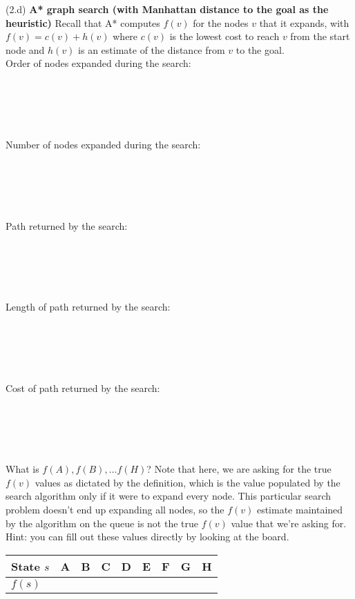 \documentclass{article}
\begin{document}
\newpage
\noindent (2.d) \textbf{A* graph search (with Manhattan distance to the goal as the heuristic)} Recall that A* computes $f(v)$ for the nodes $v$ that it expands, with $f (v) = c(v) + h(v)$ where $c(v)$ is the lowest cost to reach $v$ from the start node and $h(v)$ is an estimate of the distance from $v$ to the goal.
~\\ 
Order of nodes expanded during the search:\\
~\\
~\\
~\\
~\\
~\\
Number of nodes expanded during the search:\\
~\\
~\\
~\\
~\\
~\\
Path returned by the search:\\
~\\
~\\
~\\
~\\
~\\
Length of path returned by the search:\\
~\\
~\\
~\\
~\\
~\\
Cost of path returned by the search:\\
~\\
~\\
~\\
~\\
~\\
What is $f(A), f(B), \ldots f(H)$? Note that here, we are asking for the true $f(v)$ values as dictated by the definition, which is the value populated by the search algorithm only if it were to expand every node. This particular search problem doesn't end up expanding all nodes, so the $f(v)$ estimate maintained by the algorithm on the queue is not the true $f(v)$ value that we’re asking for. Hint: you can fill out these values directly by looking at the board.

\renewcommand\arraystretch{1.5}
\begin{table}[tbh!]
\begin{center}
    \begin{tabular}{|p{2cm}| p{1cm}| p{1cm} | p{1cm}| p{1cm} | p{1cm}| p{1cm} | p{1cm}| p{1cm}|}
\hline
    State $s$  & A & B & C & D & E & F & G & H \\ \hline
    $f(s)$ &   &   &   &  &   &   &   &  \\
\hline
\end{tabular}
\end{center}
\end{table}
\end{document}
